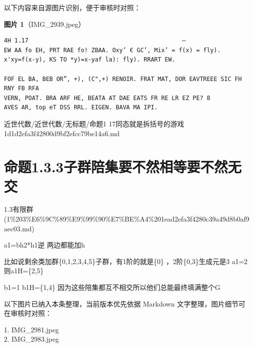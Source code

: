 \begin{note}
以下内容来自源图片识别，便于审核时对照：

\textbf{图片 1}（IMG\_2939.jpeg）
\begin{Verbatim}[fontsize=\small]
4H 1.17                                            —
EW AA fo EH, PRT RAE fo! ZBAA. Oxy’ € GC’, Mix’ = f(x) = fly).
x'xy=f(x-y), KS TO *y)=x-yaf la): fly). RRART EW.

FOF EL BA, BEB OR”, +), (C",+) RENOIR. FRAT MAT, DOR EAVTREEE SIC FH RNY FB RFA
VERN, POAT. BRA ARF HE, BEATA AT DAE EATS FR RE LR EZ PE? 8
AVES AR, top eT DSS RRL. EIGEN. BAVA MA IPI.
\end{Verbatim}

\end{note}

\begin{note}[来源路径]

近世代数/近世代数/无标题/命题1 17同态就是拆括号的游戏 1d1d2efa3f42800d9bf2efcc79be14a6.md

\end{note}

\section*{命题1.3.3子群陪集要不然相等要不然无交}

\begin{note}[来源上级主题]

1.3有限群 (1\%203\%E6\%9C\%89\%E9\%99\%90\%E7\%BE\%A4\%201ead2efa3f4280c39a49d8b0af9aec03.md)

\end{note}

\begin{proposition}[命题1.3.3子群陪集要不然相等要不然无交]

a1=bh2*h1逆 两边都能加h

比如说剩余类加群\{0,1,2,3,4,5\}子群，有1阶的就是\{0\} ，2阶\{0,3\}生成元是3 a1=2则a1H=\{2,5\}

b1=1 b1H=\{1,4\}   因为这些陪集都互不相交所以他们总能最终填满整个G

\end{proposition}

\begin{note}[关联图片]
以下图片已纳入本条整理，当前版本优先依据 Markdown 文字整理，图片细节可在审核时对照：

1. IMG\_2981.jpeg\\
2. IMG\_2983.jpeg\\

\end{note}

